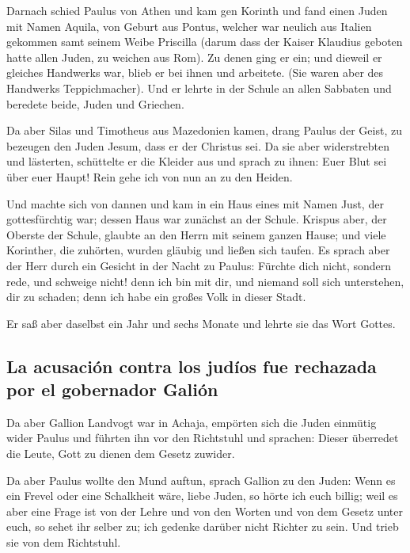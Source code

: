  Darnach schied Paulus von Athen und kam gen Korinth
 und fand einen Juden mit Namen Aquila, von Geburt aus
Pontus, welcher war neulich aus Italien gekommen samt seinem Weibe
Priscilla (darum dass der Kaiser Klaudius geboten hatte allen Juden, zu
weichen aus Rom).  Zu denen ging er ein; und dieweil er
gleiches Handwerks war, blieb er bei ihnen und arbeitete. (Sie waren
aber des Handwerks Teppichmacher).  Und er lehrte in der
Schule an allen Sabbaten und beredete beide, Juden und Griechen.

 Da aber Silas und Timotheus aus Mazedonien kamen, drang
Paulus der Geist, zu bezeugen den Juden Jesum, dass er der Christus sei.
 Da sie aber widerstrebten und lästerten, schüttelte er
die Kleider aus und sprach zu ihnen: Euer Blut sei über euer Haupt! Rein
gehe ich von nun an zu den Heiden.

 Und machte sich von dannen und kam in ein Haus eines mit
Namen Just, der gottesfürchtig war; dessen Haus war zunächst an der
Schule.  Krispus aber, der Oberste der Schule, glaubte an
den Herrn mit seinem ganzen Hause; und viele Korinther, die zuhörten,
wurden gläubig und ließen sich taufen.  Es sprach aber der
Herr durch ein Gesicht in der Nacht zu Paulus: Fürchte dich nicht,
sondern rede, und schweige nicht!  denn ich bin mit dir,
und niemand soll sich unterstehen, dir zu schaden; denn ich habe ein
großes Volk in dieser Stadt.

 Er saß aber daselbst ein Jahr und sechs Monate und
lehrte sie das Wort Gottes.

\hypertarget{la-acusaciuxf3n-contra-los-juduxedos-fue-rechazada-por-el-gobernador-galiuxf3n}{%
\subsection{La acusación contra los judíos fue rechazada por el
gobernador
Galión}\label{la-acusaciuxf3n-contra-los-juduxedos-fue-rechazada-por-el-gobernador-galiuxf3n}}

 Da aber Gallion Landvogt war in Achaja, empörten sich
die Juden einmütig wider Paulus und führten ihn vor den Richtstuhl
 und sprachen: Dieser überredet die Leute, Gott zu dienen
dem Gesetz zuwider.

 Da aber Paulus wollte den Mund auftun, sprach Gallion zu
den Juden: Wenn es ein Frevel oder eine Schalkheit wäre, liebe Juden, so
hörte ich euch billig;  weil es aber eine Frage ist von
der Lehre und von den Worten und von dem Gesetz unter euch, so sehet ihr
selber zu; ich gedenke darüber nicht Richter zu sein. 
Und trieb sie von dem Richtstuhl.

